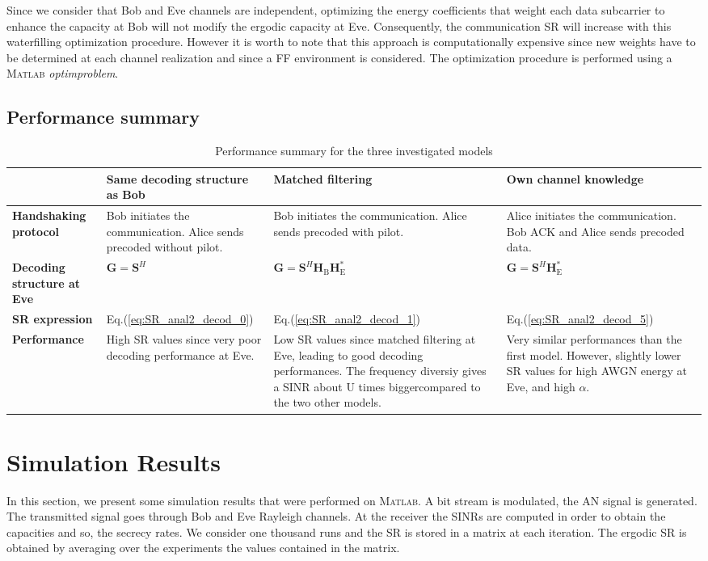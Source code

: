 \documentclass[journal,comsoc]{IEEEtran}
\let\MYoriglatexcaption\caption
\renewcommand{\caption}[2][\relax]{\MYoriglatexcaption[#2]{#2}}
\newcommand{\HE}{\textbf{H}_{\text{E}}}
\newcommand{\HB}{\textbf{H}_{\text{B}}}
\newcommand{\spread}{\textbf{S}}
\begin{document}
Since we consider that Bob and Eve channels are independent, optimizing the energy coefficients that weight each data subcarrier to enhance the capacity at Bob will not modify the  ergodic capacity at Eve. Consequently, the communication SR will increase with this waterfilling optimization procedure. However it is worth to note that this approach is computationally expensive since new weights have to be determined at each channel realization and since a FF environment is considered. The optimization procedure is performed using a \textsc{Matlab} \textit{optimproblem}.

\subsection{Performance summary}
\begin{table}[!thb]
	\centering
	\begin{tabular}{|p{1.8cm}|p{1.8cm}|p{1.8cm}|p{1.8cm}|}
		\hline
		& \textbf{Same decoding structure as Bob} & \textbf{Matched filtering}  & \textbf{Own channel knowledge}  \\ 
		\hline
		\textbf{Handshaking protocol} & Bob initiates the communication. Alice sends precoded without pilot.
		& Bob initiates the communication. Alice sends precoded with pilot. & Alice initiates the communication. Bob ACK and Alice sends precoded data.\\
		\hline
		\textbf{Decoding structure at Eve} &  $\textbf{G} = \spread^H$ & $\textbf{G} = \spread^H \HB \HE^*$ & $\textbf{G} = \spread^H \HE^*$ \\
		\hline
		\textbf{SR expression} & Eq.(\ref{eq:SR_anal2_decod_0})  &  Eq.(\ref{eq:SR_anal2_decod_1}) & Eq.(\ref{eq:SR_anal2_decod_5})\\
		\hline
		\textbf{Performance} &  High SR values since very poor decoding performance at Eve. & Low SR values since matched filtering at Eve, leading to good decoding performances. The frequency diversiy gives a SINR about U times biggercompared to the two other models.& Very similar performances than the first model. However, slightly lower SR values for high AWGN energy at Eve, and high $\alpha$. \\
		\hline
	\end{tabular}
	\caption{Performance summary for the three investigated models}
	\label{tab-perf-summary}
\end{table} 


\section{Simulation Results} \label{sec:simulation-results}
In this section, we present some simulation results that were performed on \textsc{Matlab}. A bit stream is modulated, the AN signal is generated. The transmitted signal goes through Bob and Eve Rayleigh channels. At the receiver the SINRs are computed in order to obtain the capacities and so, the secrecy rates. We consider one thousand runs and the SR is stored in a matrix at each iteration. The ergodic SR is obtained by averaging over the experiments the values contained in the matrix. 
\end{document}
